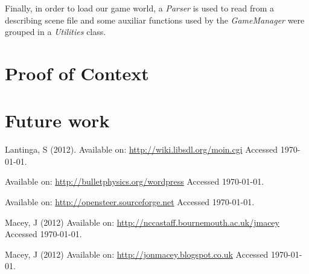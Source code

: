 \documentclass[]{article}
\begin{document}
Finally, in order to load our game world, a \emph{Parser} is used to read from a describing scene file and some auxiliar functions used by the \emph{GameManager} were grouped in a \emph{Utilities} class.



\section{Proof of Context}



\section{Future work}







\begin{thebibliography}{}

Lantinga, S (2012).
\newblock Available on:
  \url{http://wiki.libsdl.org/moin.cgi}
\newblock Accessed \today.

\newblock Available on:
  \url{http://bulletphysics.org/wordpress}
\newblock Accessed \today.

\newblock Available on:
  \url{http://opensteer.sourceforge.net}
\newblock Accessed \today.

Macey, J (2012)
\newblock Available on:
  \url{http://nccastaff.bournemouth.ac.uk/jmacey}
\newblock Accessed \today.

Macey, J (2012)
\newblock Available on:
  \url{http://jonmacey.blogspot.co.uk}
\newblock Accessed \today.

\end{thebibliography}
\end{document}
